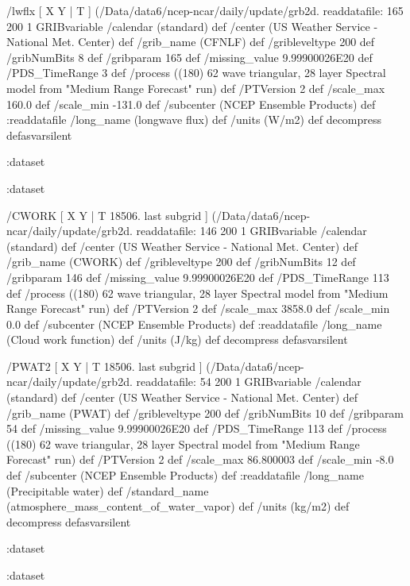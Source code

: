 \begin{ingrid}
    /lwflx { [ X Y | T ] (/Data/data6/ncep-ncar/daily/update/grb2d.%
    readdatafile:
    165 200 1 GRIBvariable
    /calendar (standard) def
    /center (US Weather Service - National Met. Center) def
    /grib_name (CFNLF) def
    /gribleveltype 200 def
    /gribNumBits 8 def
    /gribparam 165 def
    /missing_value 9.99900026E20 def
    /PDS_TimeRange 3 def
    /process ((180) 62 wave triangular, 28 layer Spectral model from "Medium Range Forecast" run) def
    /PTVersion 2 def
    /scale_max 160.0 def
    /scale_min -131.0 def
    /subcenter (NCEP Ensemble Products) def
    :readdatafile
    /long_name (longwave flux) def
    /units (W/m2) def
    decompress
    } defasvarsilent

   :dataset

  :dataset

  /CWORK { [ X Y | T 18506. last subgrid ] (/Data/data6/ncep-ncar/daily/update/grb2d.%
  readdatafile:
  146 200 1 GRIBvariable
  /calendar (standard) def
  /center (US Weather Service - National Met. Center) def
  /grib_name (CWORK) def
  /gribleveltype 200 def
  /gribNumBits 12 def
  /gribparam 146 def
  /missing_value 9.99900026E20 def
  /PDS_TimeRange 113 def
  /process ((180) 62 wave triangular, 28 layer Spectral model from "Medium Range Forecast" run) def
  /PTVersion 2 def
  /scale_max 3858.0 def
  /scale_min 0.0 def
  /subcenter (NCEP Ensemble Products) def
  :readdatafile
  /long_name (Cloud work function) def
  /units (J/kg) def
  decompress
  } defasvarsilent
  
  /PWAT2 { [ X Y | T 18506. last subgrid ] (/Data/data6/ncep-ncar/daily/update/grb2d.%
  readdatafile:
  54 200 1 GRIBvariable
  /calendar (standard) def
  /center (US Weather Service - National Met. Center) def
  /grib_name (PWAT) def
  /gribleveltype 200 def
  /gribNumBits 10 def
  /gribparam 54 def
  /missing_value 9.99900026E20 def 
  /PDS_TimeRange 113 def
  /process ((180) 62 wave triangular, 28 layer Spectral model from "Medium Range Forecast" run) def
  /PTVersion 2 def
  /scale_max 86.800003 def
  /scale_min -8.0 def
  /subcenter (NCEP Ensemble Products) def
  :readdatafile
  /long_name (Precipitable water) def
  /standard_name (atmosphere_mass_content_of_water_vapor) def
  /units (kg/m2) def
  decompress
  } defasvarsilent
 
 :dataset

:dataset

\end{ingrid}
